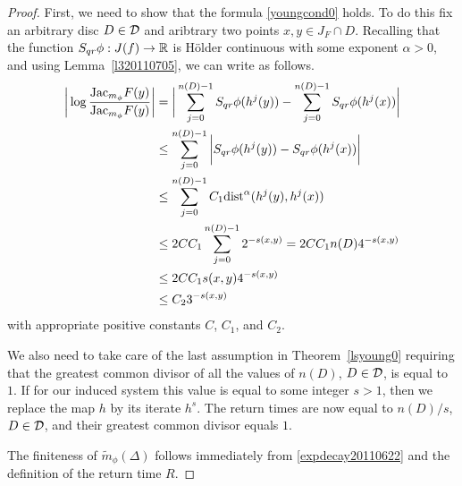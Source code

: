 \documentclass[12pt]{amsart}
\numberwithin{equation}{section}
\newcommand{\nl}{\newline}
\def\dist{\text{{\rm dist}}}  \def\Dist{\text{{\rm Dist}}}
\def\a{\alpha}                \def\b{\beta}             \def\d{\delta}
\def\De{\Delta}               \def\e{\varepsilon}          \def\f{\phi}
\def\sp{\medskip}             \def\fr{\noindent}        \def\nl{\newline}
\begin{document}
\begin{proof}
First, we need to show that the formula \eqref{youngcond0}
holds. To do this fix an arbitrary disc $D\in\mathcal D$ and aribtrary two
points $x,y\in J_F\cap D$. Recalling that the function $S_{qr}\phi:J(f)\to{\mathbb R}$ is 
H\"older continuous with some exponent $\a>0$, and using
Lemma~\ref{l320110705}, we can write as follows.
$$
\aligned
\bigg|\log\frac{\Jac_{m_\phi}F(y)}{\Jac_{m_\phi}F(y)}\bigg|
&=\bigg|\sum_{j=0}^{n(D)-1}S_{qr}\phi(h^j(y))
        -\sum_{j=0}^{n(D)-1}S_{qr}\phi(h^j(x))\bigg|\\    
&\le\sum_{j=0}^{n(D)-1}\bigg|S_{qr}\phi(h^j(y))-S_{qr}\phi(h^j(x))\bigg|\\
&\le\sum_{j=0}^{n(D)-1}C_1\dist^\a(h^j(y),h^j(x)) \\
&\le 2CC_1\sum_{j=0}^{n(D)-1}2^{-s(x,y)} 
=   2CC_1n(D)4^{-s(x,y)} \\
&\le 2CC_1s(x,y)4^{-s(x,y)} \\
&\le C_23^{-s(x,y)}
\endaligned
$$
with appropriate positive constants $C$, $C_1$, and $C_2$. 

\sp\fr We also need to take care of the last assumption in
Theorem~\ref{lsyoung0} requiring that the 
greatest common divisor of all the values of $n(D)$, $D\in\mathcal D$, is
equal to $1$. If for our induced system this value is equal to some
integer $s>1$, then we replace the map $h$ by its iterate $h^s$. The
return times are now equal to $n(D)/s$, $D\in\mathcal D$,
and their greatest common divisor equals $1$. 

\sp\fr The finiteness of $\tilde m_\phi(\De)$ follows
immediately from \eqref{expdecay20110622} and the definition of the
return time $R$.
\end{proof}

\
\end{document}

